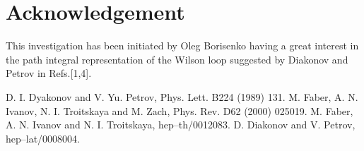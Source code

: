 \documentclass[a4paper,11pt]{article}
\begin{document}
\section*{Acknowledgement}

\hspace{0.2in} This investigation has been initiated by Oleg Borisenko
having a great interest in the path integral representation of the
Wilson loop suggested by Diakonov and Petrov in Refs.[1,4].

\newpage

\begin{thebibliography}{9}
\bibitem{[1]} 
D. I. Dyakonov and V. Yu. Petrov, Phys. Lett. B224
(1989) 131.
\bibitem{[2]} 
M. Faber, A. N. Ivanov, N. I. Troitskaya  and M. Zach,
Phys. Rev. D62 (2000) 025019.
\bibitem{[3]} 
M. Faber, A. N. Ivanov and  N. I. Troitskaya, hep--th/0012083.
\bibitem{[4]} 
D. Diakonov and V. Petrov,  hep--lat/0008004.
\end{thebibliography}
\end{document}
